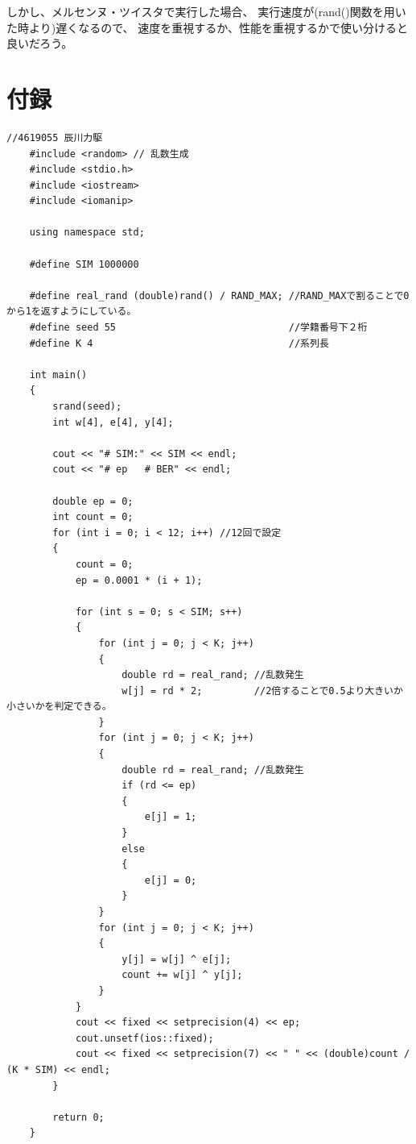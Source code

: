 \documentclass[12pt]{jarticle}
\begin{document}
しかし、メルセンヌ・ツイスタで実行した場合、
実行速度が(rand()関数を用いた時より)遅くなるので、
速度を重視するか、性能を重視するかで使い分けると良いだろう。

\clearpage
\appendix
\section{付録}
\begin{lstlisting}[style = lstcpp,caption=kadai3\_rand.cpp]
    //4619055 辰川力駆
    #include <random> // 乱数生成
    #include <stdio.h>
    #include <iostream>
    #include <iomanip>
    
    using namespace std;
    
    #define SIM 1000000
    
    #define real_rand (double)rand() / RAND_MAX; //RAND_MAXで割ることで0から1を返すようにしている。
    #define seed 55                              //学籍番号下２桁
    #define K 4                                  //系列長
    
    int main()
    {
        srand(seed);
        int w[4], e[4], y[4];
    
        cout << "# SIM:" << SIM << endl;
        cout << "# ep   # BER" << endl;
    
        double ep = 0;
        int count = 0;
        for (int i = 0; i < 12; i++) //12回で設定
        {
            count = 0;
            ep = 0.0001 * (i + 1);
    
            for (int s = 0; s < SIM; s++)
            {
                for (int j = 0; j < K; j++)
                {
                    double rd = real_rand; //乱数発生
                    w[j] = rd * 2;         //2倍することで0.5より大きいか小さいかを判定できる。
                }
                for (int j = 0; j < K; j++)
                {
                    double rd = real_rand; //乱数発生
                    if (rd <= ep)
                    {
                        e[j] = 1;
                    }
                    else
                    {
                        e[j] = 0;
                    }
                }
                for (int j = 0; j < K; j++)
                {
                    y[j] = w[j] ^ e[j];
                    count += w[j] ^ y[j];
                }
            }
            cout << fixed << setprecision(4) << ep;
            cout.unsetf(ios::fixed);
            cout << fixed << setprecision(7) << " " << (double)count / (K * SIM) << endl;
        }
    
        return 0;
    }
\end{lstlisting}
\end{document}
